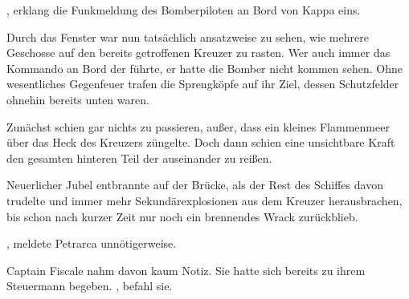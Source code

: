 , erklang die Funkmeldung des Bomberpiloten an Bord von Kappa eins. 

\par

Durch das Fenster war nun tatsächlich ansatzweise zu sehen, wie mehrere Geschosse auf den bereits getroffenen Kreuzer zu rasten. Wer auch immer das Kommando an Bord der  führte, er hatte die Bomber nicht kommen sehen. Ohne wesentliches Gegenfeuer trafen die Sprengköpfe auf ihr Ziel, dessen Schutzfelder ohnehin bereits unten waren.

\par

Zunächst schien gar nichts zu passieren, außer, dass ein kleines Flammenmeer über das Heck des Kreuzers züngelte. Doch dann schien eine unsichtbare Kraft den gesamten hinteren Teil der  auseinander zu reißen.

\par

Neuerlicher Jubel entbrannte auf der Brücke, als der Rest des Schiffes davon trudelte und immer mehr Sekundärexplosionen aus dem Kreuzer herausbrachen, bis schon nach kurzer Zeit nur noch ein brennendes Wrack zurückblieb.

\par

, meldete Petrarca unnötigerweise.

\par

Captain Fiscale nahm davon kaum Notiz. Sie hatte sich bereits zu ihrem Steuermann begeben. , befahl sie. 

